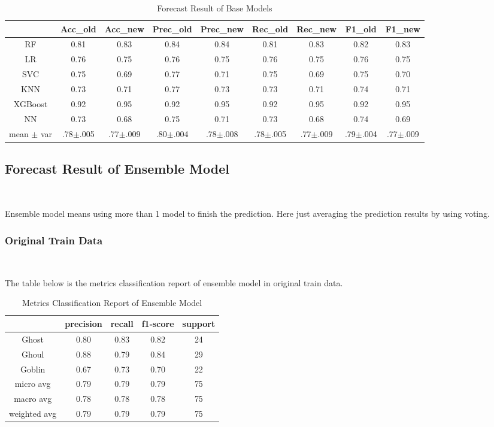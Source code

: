 \begin{table}[h]\centering
	\caption{Forecast Result of Base Models}
	\begin{tabular}{ccccccccc}
		\toprule
		& Acc_old & Acc_new & Prec_old & Prec_new & Rec_old & Rec_new & F1_old & F1_new\\
		\midrule
		RF & 0.81 &      0.83 & 0.84 & 0.84 & 0.81 & 0.83 & 0.82 & 0.83\\
		LR & 0.76 &      0.75 & 0.76 & 0.75 & 0.76 & 0.75 & 0.76 & 0.75\\
		SVC & 0.75 &     0.69 & 0.77 & 0.71 & 0.75 & 0.69 & 0.75 & 0.70\\
		KNN & 0.73 &     0.71 & 0.77 & 0.73 & 0.73 & 0.71 & 0.74 & 0.71\\
		XGBoost & 0.92 & 0.95 & 0.92 & 0.95 & 0.92 & 0.95 & 0.92 & 0.95\\
		NN & 0.73 &      0.68 & 0.75 & 0.71 & 0.73 & 0.68 & 0.74 & 0.69\\
		mean $\pm$ var & .78$\pm$.005 & .77$\pm$.009 &
		.80$\pm$.004 & .78$\pm$.008 &
		.78$\pm$.005 & .77$\pm$.009 &
		.79$\pm$.004 & .77$\pm$.009\\	
		\bottomrule
	\end{tabular}
\end{table}

\subsection{Forecast Result of Ensemble Model }
\

Ensemble model means using 
more than 1 model to finish the prediction.
Here just averaging the prediction results 
by using voting. 

\subsubsection{Original Train Data}
\

The table below is the metrics classification report 
of ensemble model in original train data.

\begin{table}[h]  \centering
	\caption{Metrics Classification Report of Ensemble Model}
	\label{tbl:metrics_classification_ensemble_old}
	\begin{tabular}{ccccc}
		\hline
		& precision  &  recall & f1-score &  support\\
		\hline
		Ghost   &    0.80   &   0.83  & 0.82 & 24\\
		Ghoul  &  0.88  &  0.79  &   0.84   &   29\\
		Goblin  &   0.67  &  0.73 &  0.70  &   22\\
		\hline
		micro avg  &  0.79  &  0.79  & 0.79    &  75\\
		macro avg  &  0.78  & 0.78  &  0.78  &  75\\
		weighted avg  &   0.79  &  0.79 &  0.79  &  75\\
		\hline 
	\end{tabular}
\end{table}

